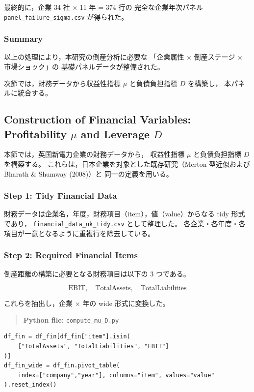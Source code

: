 最終的に，企業 34 社 × 11 年 = 374 行の
完全な企業年次パネル \texttt{panel\_failure\_sigma.csv} が得られた。

\subsubsection*{Summary}

以上の処理により，本研究の倒産分析に必要な
「企業属性 × 倒産ステージ × 市場ショック」の
基礎パネルデータが整備された。

次節では，財務データから収益性指標 $\mu$ と負債負担指標 $D$ を構築し，
本パネルに統合する。

\subsection*{Construction of Financial Variables: Profitability $\mu$ and Leverage $D$}

本節では，英国新電力企業の財務データから，
収益性指標 $\mu$ と負債負担指標 $D$ を構築する。
これらは，日本企業を対象とした既存研究（Merton 型近似および Bharath \& Shumway (2008)）と
同一の定義を用いる。

\subsubsection*{Step 1: Tidy Financial Data}

財務データは企業名，年度，財務項目（item），値（value）からなる tidy 形式であり，
\texttt{financial\_data\_uk\_tidy.csv} として整理した。
各企業・各年度・各項目が一意となるように重複行を除去している。

\subsubsection*{Step 2: Required Financial Items}

倒産距離の構築に必要となる財務項目は以下の 3 つである。



\[
\text{EBIT},\quad
\text{TotalAssets},\quad
\text{TotalLiabilities}
\]



これらを抽出し，企業 $\times$ 年の wide 形式に変換した。

\begin{quote}
\textbf{Python file:} \texttt{compute\_mu\_D.py}
\end{quote}

\begin{verbatim}
df_fin = df_fin[df_fin["item"].isin(
    ["TotalAssets", "TotalLiabilities", "EBIT"]
)]
df_fin_wide = df_fin.pivot_table(
    index=["company","year"], columns="item", values="value"
).reset_index()
\end{verbatim}

